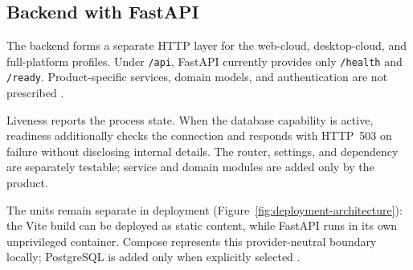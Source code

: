 \subsection{Backend with FastAPI}
\label{subsec:fastapi-backend}

The backend forms a separate HTTP layer for the web-cloud, desktop-cloud, and
full-platform profiles. Under \texttt{/api}, FastAPI currently provides only
\texttt{/health} and \texttt{/ready}. Product-specific services, domain models,
and authentication are not prescribed
\parencite{fastapi2026features,kleiveist2026architecture}.

Liveness reports the process state. When the database capability is active,
readiness additionally checks the connection and responds with HTTP~503 on
failure without disclosing internal details. The router, settings, and
dependency are separately testable; service and domain modules are added only
by the product.

The units remain separate in deployment
(Figure~\ref{fig:deployment-architecture}): the Vite build can be deployed as
static content, while FastAPI runs in its own unprivileged container. Compose
represents this provider-neutral boundary locally; PostgreSQL is added only
when explicitly selected
\parencite{kleiveist2026deployment}.


